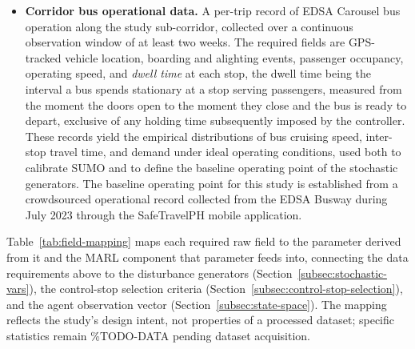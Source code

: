 \begin{itemize}

\item \textbf{Corridor bus operational data.} A per-trip record of EDSA Carousel bus operation along the study sub-corridor, collected over a continuous observation window of at least two weeks. The required fields are GPS-tracked vehicle location, boarding and alighting events, passenger occupancy, operating speed, and \textit{dwell time} at each stop, the dwell time being the interval a bus spends stationary at a stop serving passengers, measured from the moment the doors open to the moment they close and the bus is ready to depart, exclusive of any holding time subsequently imposed by the controller. These records yield the empirical distributions of bus cruising speed, inter-stop travel time, and demand under ideal operating conditions, used both to calibrate SUMO and to define the baseline operating point of the stochastic generators. The baseline operating point for this study is established from a crowdsourced operational record collected from the EDSA Busway during July 2023 through the SafeTravelPH mobile application.


\end{itemize}

Table~\ref{tab:field-mapping} maps each required raw field to the parameter derived from it and the MARL component that parameter feeds into, connecting the data requirements above to the disturbance generators (Section~\ref{subsec:stochastic-vars}), the control-stop selection criteria (Section~\ref{subsec:control-stop-selection}), and the agent observation vector (Section~\ref{subsec:state-space}). The mapping reflects the study's design intent, not properties of a processed dataset; specific statistics remain \%TODO-DATA pending dataset acquisition.

